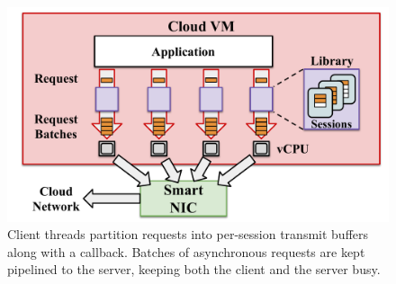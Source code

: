 \begin{figure}[t]
\centering
\includegraphics[width=0.9\columnwidth]{figures/client.pdf}
\caption{Client threads partition requests into per-session transmit buffers
  along with a callback.  Batches of asynchronous requests are kept pipelined
  to the server, keeping both the client and the server busy.}
\label{fig:client}
\end{figure}
